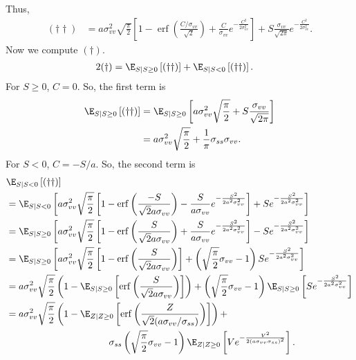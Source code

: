 \documentclass{article}
\begin{document}
Thus,
\begin{align*}
    (\dagger \dagger)
    &= a \sigma_{vv}^2 \sqrt{\frac{\pi}{2}} \left[ 1 - \operatorname{erf}\left(\frac{ C / \sigma_{vv} }{\sqrt{2}}\right) + \frac{C}{\sigma_{vv}} e^{-\frac{C^2}{2 \sigma_{vv}^2}} \right] + S \frac{\sigma_{vv}}{\sqrt{2\pi}} e^{ -\frac{C^2}{2 \sigma_{vv}^2} }.
\end{align*}
Now we compute $(\dagger)$.
\begin{align*}
    2 (\dagger)
    &= \E_{S \mid S \geq 0} \left[ (\dagger \dagger) \right] + \E_{S \mid S < 0} \left[ (\dagger \dagger) \right].
\end{align*}
For $S \geq 0$, $C = 0$.
So, the first term is
\begin{align*}
    \E_{S \mid S \geq 0} \left[ (\dagger \dagger) \right]
    &= \E_{S \mid S \geq 0} \left[ a \sigma_{vv}^2\sqrt{\frac{\pi}{2}} + S \frac{\sigma_{vv}}{\sqrt{2\pi}} \right] \\
    &= a \sigma_{vv}^2\sqrt{\frac{\pi}{2}} + \frac{1}{\pi} \sigma_{ss} \sigma_{vv}.
\end{align*}
For $S < 0$, $C = -S/a$.
So, the second term is
\begin{align*}
    &\E_{S \mid S < 0} \left[ (\dagger \dagger) \right] \\
    &= \E_{S \mid S < 0} \left[ a \sigma_{vv}^2\sqrt{\frac{\pi}{2}} \left[ 1 - \operatorname{erf}\left(\frac{ -S }{\sqrt{2} a \sigma_{vv}}\right) - \frac{S}{a \sigma_{vv}} e^{-\frac{S^2}{2 a^2 \sigma_{vv}^2}} \right] + S e^{ -\frac{S^2}{2 a^2 \sigma_{vv}^2} } \right] \\
    &= \E_{S \mid S \geq 0} \left[ a \sigma_{vv}^2\sqrt{\frac{\pi}{2}} \left[ 1 - \operatorname{erf}\left(\frac{ S }{\sqrt{2} a \sigma_{vv}}\right) + \frac{S}{a \sigma_{vv}} e^{-\frac{S^2}{2 a^2 \sigma_{vv}^2}} \right] - S e^{ -\frac{S^2}{2 a^2 \sigma_{vv}^2} } \right] \\
    &= \E_{S \mid S \geq 0} \left[ a \sigma_{vv}^2\sqrt{\frac{\pi}{2}} \left[ 1 - \operatorname{erf}\left(\frac{ S }{\sqrt{2} a \sigma_{vv}}\right) \right] + \left( \sqrt{\frac{\pi}{2}} \sigma_{vv} - 1 \right) S e^{-\frac{S^2}{2 a^2 \sigma_{vv}^2}} \right] \\
    &= a \sigma_{vv}^2\sqrt{\frac{\pi}{2}} \left( 1 -  \E_{S \mid S \geq 0} \left[ \operatorname{erf}\left(\frac{ S }{\sqrt{2} a \sigma_{vv}}\right) \right] \right) + \left( \sqrt{\frac{\pi}{2}} \sigma_{vv} - 1 \right) \E_{S \mid S \geq 0} \left[ S e^{ -\frac{S^2}{2 a^2 \sigma_{vv}^2} } \right] \\
    &= a \sigma_{vv}^2\sqrt{\frac{\pi}{2}} \left( 1 -  \E_{Z \mid Z \geq 0} \left[ \operatorname{erf}\left(\frac{ Z }{\sqrt{2} (a \sigma_{vv} / \sigma_{ss})}\right) \right] \right) + \\
    &\hspace{1.5in} \sigma_{ss} \left( \sqrt{\frac{\pi}{2}} \sigma_{vv} - 1 \right) \E_{Z \mid Z \geq 0} \left[ V e^{ -\frac{V^2}{2 (a \sigma_{vv} \sigma_{ss})^2} } \right].
\end{align*}
\end{document}
